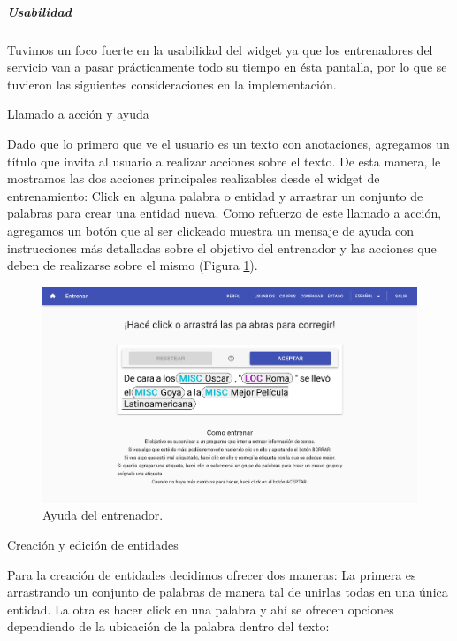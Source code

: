 \documentclass[12pt,a4paper,]{scrartcl}
\let\oldsubparagraph\subparagraph
\renewcommand{\subparagraph}[1]{\oldsubparagraph{#1}\mbox{}}
\begin{document}
\hypertarget{usabilidad}{%
\subparagraph{Usabilidad}\label{usabilidad}}

Tuvimos un foco fuerte en la usabilidad del widget ya que los entrenadores del servicio van a pasar prácticamente todo su tiempo en ésta pantalla, por lo que se tuvieron las siguientes consideraciones en la implementación.

Llamado a acción y ayuda

Dado que lo primero que ve el usuario es un texto con anotaciones, agregamos un título que invita al usuario a realizar acciones sobre el texto. De esta manera, le mostramos las dos acciones principales realizables desde el widget de entrenamiento: Click en alguna palabra o entidad y arrastrar un conjunto de palabras para crear una entidad nueva.
Como refuerzo de este llamado a acción, agregamos un botón que al ser clickeado muestra un mensaje de ayuda con instrucciones más detalladas sobre el objetivo del entrenador y las acciones que deben de realizarse sobre el mismo (Figura \ref{fig:logic-train-help}).

\begin{figure}[H]

{\centering \includegraphics{assets/logic/train-help.pdf} 

}

\caption{Ayuda del entrenador.}\label{fig:logic-train-help}
\end{figure}

Creación y edición de entidades

Para la creación de entidades decidimos ofrecer dos maneras: La primera es arrastrando un conjunto de palabras de manera tal de unirlas todas en una única entidad.
La otra es hacer click en una palabra y ahí se ofrecen opciones dependiendo de la ubicación de la palabra dentro del texto:
\end{document}
